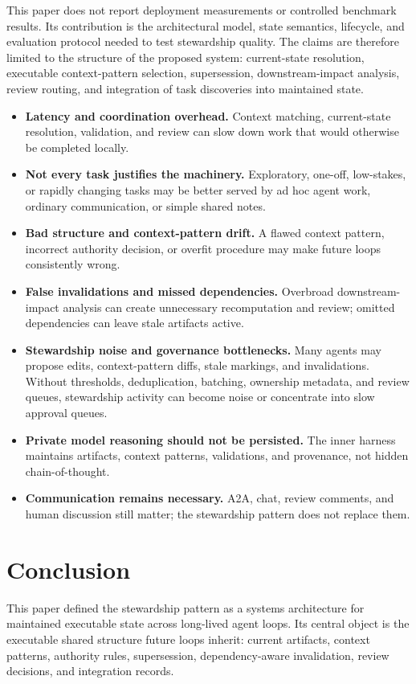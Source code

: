 \documentclass{article}
\begin{document}
This paper does not report deployment measurements or controlled benchmark results. Its contribution is the architectural model, state semantics, lifecycle, and evaluation protocol needed to test stewardship quality. The claims are therefore limited to the structure of the proposed system: current-state resolution, executable context-pattern selection, supersession, downstream-impact analysis, review routing, and integration of task discoveries into maintained state.

\begin{itemize}[leftmargin=*]
\item \textbf{Latency and coordination overhead.} Context matching, current-state resolution, validation, and review can slow down work that would otherwise be completed locally.
\item \textbf{Not every task justifies the machinery.} Exploratory, one-off, low-stakes, or rapidly changing tasks may be better served by ad hoc agent work, ordinary communication, or simple shared notes.
\item \textbf{Bad structure and context-pattern drift.} A flawed context pattern, incorrect authority decision, or overfit procedure may make future loops consistently wrong.
\item \textbf{False invalidations and missed dependencies.} Overbroad downstream-impact analysis can create unnecessary recomputation and review; omitted dependencies can leave stale artifacts active.
\item \textbf{Stewardship noise and governance bottlenecks.} Many agents may propose edits, context-pattern diffs, stale markings, and invalidations. Without thresholds, deduplication, batching, ownership metadata, and review queues, stewardship activity can become noise or concentrate into slow approval queues.
\item \textbf{Private model reasoning should not be persisted.} The inner harness maintains artifacts, context patterns, validations, and provenance, not hidden chain-of-thought.
\item \textbf{Communication remains necessary.} A2A, chat, review comments, and human discussion still matter; the stewardship pattern does not replace them.
\end{itemize}

\section{Conclusion}

This paper defined the stewardship pattern as a systems architecture for maintained executable state across long-lived agent loops. Its central object is the executable shared structure future loops inherit: current artifacts, context patterns, authority rules, supersession, dependency-aware invalidation, review decisions, and integration records.
\end{document}
